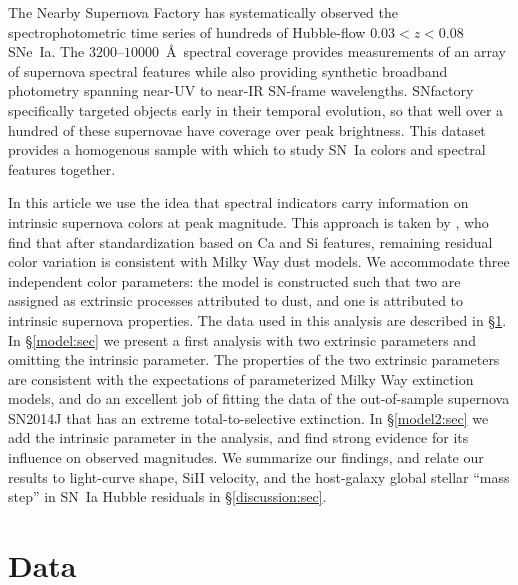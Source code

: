 \documentclass{aastex61}   	%
\begin{document}
The Nearby Supernova Factory \citep[SNfactory;][]{2002SPIE.4836...61A} has systematically observed the
spectrophotometric time series of hundreds of Hubble-flow $0.03<z<0.08$ SNe~Ia.   The $3200$--$10000$~\AA\ spectral coverage
provides measurements of an array of supernova spectral features while also providing synthetic broadband photometry
spanning near-UV to near-IR SN-frame wavelengths.  SNfactory specifically targeted objects
early in their temporal evolution, so that well over a hundred of these supernovae have  coverage over
peak brightness.  This dataset provides a homogenous sample with which to study SN~Ia colors and spectral features together.

In this article we use the idea that spectral indicators carry information on intrinsic supernova colors at peak magnitude.
This approach is taken by \citet{2011A&A...529L...4C}, who find that after standardization based on Ca and Si features, remaining residual color
variation is consistent with Milky Way dust models.
We accommodate  three independent color parameters: the model is constructed such that 
two are assigned as extrinsic processes attributed to dust, and one is attributed to intrinsic supernova
properties.
The data used in this analysis are described in \S\ref{data:sec}.
In \S\ref{model:sec} we present a
first analysis with two extrinsic parameters and omitting the intrinsic parameter.  The properties of the two extrinsic parameters
are consistent with the expectations of parameterized Milky Way extinction models, and do an excellent job of fitting the data of the out-of-sample
supernova SN2014J that has an extreme total-to-selective extinction.
In \S\ref{model2:sec} we add the intrinsic parameter in the analysis, and find strong evidence for its influence on observed magnitudes.
We summarize our findings, and relate our results to light-curve shape, SiII velocity, and the host-galaxy global stellar ``mass step'' in SN~Ia Hubble
residuals in \S\ref{discussion:sec}.


\section{Data}
\label{data:sec}
\end{document}
